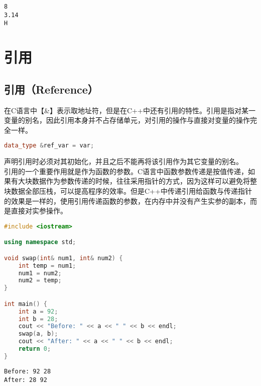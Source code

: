 \begin{tcolorbox}
	\begin{verbatim}
8
3.14
H
	\end{verbatim}
\end{tcolorbox}

\newpage

\section{引用}

\subsection{引用（Reference）}

在C语言中【\&】表示取地址符，但是在C++中还有引用的特性。引用是指对某一变量的别名，因此引用本身并不占存储单元，对引用的操作与直接对变量的操作完全一样。

\vspace{-0.5cm}

\begin{lstlisting}[language=C++]
data_type &ref_var = var;
\end{lstlisting}

声明引用时必须对其初始化，并且之后不能再将该引用作为其它变量的别名。\\

引用的一个重要作用就是作为函数的参数。C语言中函数参数传递是按值传递，如果有大块数据作为参数传递的时候，往往采用指针的方式，因为这样可以避免将整块数据全部压栈，可以提高程序的效率。但是C++中传递引用给函数与传递指针的效果是一样的，使用引用传递函数的参数，在内存中并没有产生实参的副本，而是直接对实参操作。\\


\begin{lstlisting}[language=C++]
#include <iostream>

using namespace std;

void swap(int& num1, int& num2) {
    int temp = num1;
    num1 = num2;
    num2 = temp;
}

int main() {
    int a = 92;
    int b = 28;
    cout << "Before: " << a << " " << b << endl;
    swap(a, b);
    cout << "After: " << a << " " << b << endl;
    return 0;
}
\end{lstlisting}

\begin{tcolorbox}
	\begin{verbatim}
Before: 92 28
After: 28 92
	\end{verbatim}
\end{tcolorbox}

